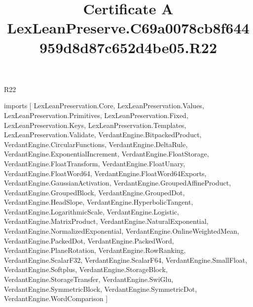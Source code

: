 \begin{lexlean}{R22}
\title{Certificate A LexLeanPreserve.C69a0078cb8f644959d8d87c652d4be05.R22}
\begin{coremodule}
imports [
  LexLeanPreservation.Core,
  LexLeanPreservation.Values,
  LexLeanPreservation.Primitives,
  LexLeanPreservation.Fixed,
  LexLeanPreservation.Keys,
  LexLeanPreservation.Templates,
  LexLeanPreservation.Validate,
  VerdantEngine.BitpackedProduct,
  VerdantEngine.CircularFunctions,
  VerdantEngine.DeltaRule,
  VerdantEngine.ExponentialIncrement,
  VerdantEngine.FloatStorage,
  VerdantEngine.FloatTransform,
  VerdantEngine.FloatUnary,
  VerdantEngine.FloatWord64,
  VerdantEngine.FloatWord64Exports,
  VerdantEngine.GaussianActivation,
  VerdantEngine.GroupedAffineProduct,
  VerdantEngine.GroupedBlock,
  VerdantEngine.GroupedDot,
  VerdantEngine.HeadSlope,
  VerdantEngine.HyperbolicTangent,
  VerdantEngine.LogarithmicScale,
  VerdantEngine.Logistic,
  VerdantEngine.MatrixProduct,
  VerdantEngine.NaturalExponential,
  VerdantEngine.NormalizedExponential,
  VerdantEngine.OnlineWeightedMean,
  VerdantEngine.PackedDot,
  VerdantEngine.PackedWord,
  VerdantEngine.PlaneRotation,
  VerdantEngine.RowRanking,
  VerdantEngine.ScalarF32,
  VerdantEngine.ScalarF64,
  VerdantEngine.SmallFloat,
  VerdantEngine.Softplus,
  VerdantEngine.StorageBlock,
  VerdantEngine.StorageTransfer,
  VerdantEngine.SwiGlu,
  VerdantEngine.SymmetricBlock,
  VerdantEngine.SymmetricDot,
  VerdantEngine.WordComparison
]


\end{coremodule}
\end{lexlean}
